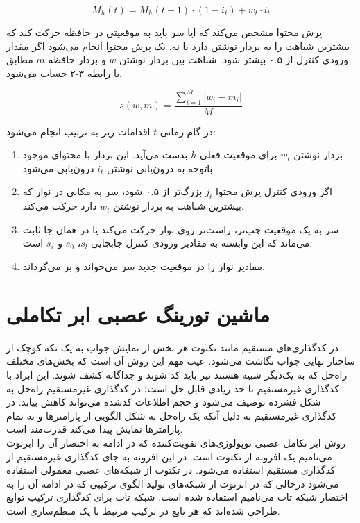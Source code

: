 \begin{equation}
M_h(t) = M_h(t − 1) · (1 − i_t) + w_t · i_t
\end{equation}

پرش محتوا مشخص می‌کند که آیا سر باید به موقعیتی در حافظه حرکت کند که بیشترین شباهت را به بردار نوشتن دارد یا نه. یک پرش محتوا انجام می‌شود اگر مقدار ورودی کنترل از ۰.۵ بیشتر شود. شباهت بین بردار نوشتن $w$ و بردار حافظه $m$‌ مطابق با رابطه ۳-۲ حساب می‌شود.\cite{merrild2018hyperntm}

\begin{equation}
s(w, m) = \frac{\sum_{i=1}^{M} |w_i−m_i| }{M} 
\end{equation}

در گام زمانی $t$ اقدامات زیر به ترتیب انجام می‌شود:
\begin{enumerate}
\item بردار نوشتن $w_t$ برای موقعیت فعلی $h$ بدست می‌آید. این بردار با محتوای موجود باتوجه به درون‌یابی نوشتن $i_t$ درون‌یابی می‌شود.
\item اگر ورودی کنترل پرش محتوا $j_t$ بزرگ‌تر از ۰.۵ شود، سر به مکانی در نوار که بیشترین شباهت به بردار نوشتن $w_t$ دارد حرکت می‌کند.
\item سر به یک موقعیت چپ‌تر، راست‌تر روی نوار حرکت می‌کند یا در همان جا ثابت می‌ماند که این وابسته به مقادیر ورودی کنترل جابجایی $s_l$، $s_0$  و $s_r$ است.
\item مقادیر نوار را در موقعیت جدید سر می‌خواند و بر می‌گرداند.\cite{merrild2018hyperntm}
\end{enumerate}

\section{ماشین تورینگ عصبی ابر تکاملی}
در کدگذاری‌های مستقیم مانند تکتوت هر بخش از نمایش جواب به یک تکه کوچک از ساختار نهایی جواب نگاشت می‌شود. عیب مهم این روش آن است که بخش‌های مختلف راه‌حل که به یک‌دیگر شبیه هستند نیز باید کد شوند و جداگانه کشف شوند. این ابراد با کدگذاری غیرمستقیم تا حد زیادی قابل حل است؛ در کدگذاری غیرمستقیم راه‌حل به شکل فشرده توصیف می‌شود و حجم اطلاعات کدشده می‌تواند کاهش بیابد. در کدگذاری غیرمستقیم به دلیل آنکه یک راه‌حل به شکل الگویی از پارامترها و نه تمام پارامترها نمایش پیدا می‌کند قدرت‌مند است.\cite{merrild2018hyperntm}
\\

روش ابر تکامل عصبی توپولوژی‌های تقویت‌کننده که در ادامه به اختصار آن را ابرتوت می‌نامیم یک افزونه از تکتوت است. در این افزونه به جای کدگذاری غیرمستقیم از کدگذاری مستقیم استفاده می‌شود. در تکتوت از شبکه‌های عصبی معمولی استفاده می‌شود درحالی که در ابرتوت از شبکه‌های تولید الگوی ترکیبی که در ادامه آن را به اختصار شبکه تات می‌نامیم استفاده شده است. شبکه تات برای کدگذاری ترکیب توابع طراحی شده‌اند که هر تابع در ترکیب مرتبط با یک منظم‌سازی است.\cite{merrild2018hyperntm}
\\

